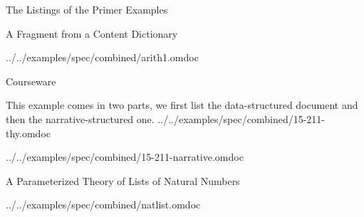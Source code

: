 \begin{omgroup}[id=examples]{The Listings of the Primer Examples}
\begin{omgroup}[id=examples.arith1]{A Fragment from a Content Dictionary}


  {../../examples/spec/combined/arith1.omdoc}
\end{omgroup}

\begin{omgroup}[id=examples.courseware]{Courseware}

This example comes in two parts, we first list the data-structured document and
then the narrative-structured one.
 {../../examples/spec/combined/15-211-thy.omdoc}


  {../../examples/spec/combined/15-211-narrative.omdoc}
\end{omgroup}

\begin{omgroup}[id=examples.natlist,short=Lists of Natural Numbers]
                           {A Parameterized Theory  of Lists of Natural Numbers}


  {../../examples/spec/combined/natlist.omdoc}
\end{omgroup}
\end{omgroup}

